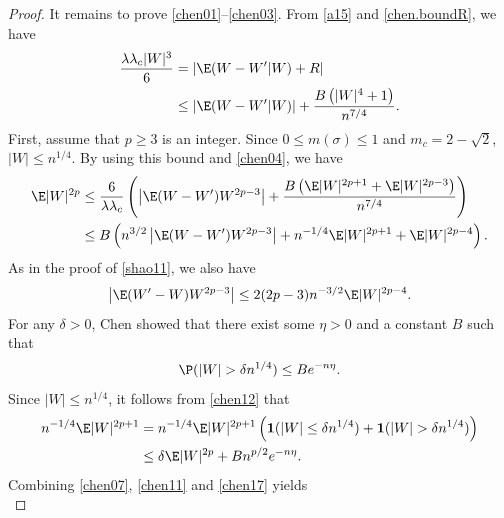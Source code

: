 \begin{proof}
		It remains to prove \eqref{chen01}--\eqref{chen03}. 
		From \eqref{a15} and \eqref{chen.boundR}, we have
		\begin{equation}\label{chen04}
			\begin{split}
				\frac{\lambda \lambda_c |W|^3}{6}&=|\E(W-W'|W)+R|\\
				&\le |\E(W-W'|W)|+\frac{B\left(|W|^4+1\right)}{n^{7/4}}.
			\end{split}
		\end{equation}
First, assume that $p\ge 3$ is an integer.
Since $0\le m(\sigma)\le 1$ and $m_c=2-\sqrt{2}$, $|W|\le n^{1/4}$. By using this bound and \eqref{chen04}, we have
		\begin{equation}\label{chen07}
			\begin{split}
				\E|W|^{2p}&\le 	\frac{6}{\lambda\lambda_c}\left(\left|\E(W-W')W^{2p-3}\right|+\frac{B\left(\E|W|^{2p+1}+\E|W|^{2p-3}\right)}{n^{7/4}}\right)\\
				&\le B\left(n^{3/2}\left|\E(W-W')W^{2p-3}\right|+n^{-1/4}\E|W|^{2p+1}+\E|W|^{2p-4}\right).
			\end{split}
		\end{equation}
		As in the proof of \eqref{shao11}, we also have
		\begin{equation}\label{chen11}
			\begin{split}
				\left|\E(W'-W)W^{2p-3}\right|\le 2(2p-3)n^{-3/2}\E|W|^{2p-4}.
			\end{split}
		\end{equation}
		For any $\delta>0$, Chen \cite{chen2016limit} showed that there exist some $\eta>0$ and a constant $B$ such that
		\begin{equation}\label{chen12}
			\begin{split}
				\P(|W|>\delta n^{1/4})\le Be^{-n\eta}.
			\end{split}
		\end{equation}
Since $|W|\le n^{1/4}$, it follows from \eqref{chen12} that
		\begin{equation}\label{chen17}
			\begin{split}
n^{-1/4}\E|W|^{2p+1}&=n^{-1/4}\E|W|^{2p+1}\left(\mathbf{1}(|W|\le \delta n^{1/4})+\mathbf{1}(|W|> \delta n^{1/4})\right)\\
				&\le \delta \E|W|^{2p}+Bn^{p/2}e^{-n\eta}.
			\end{split}
		\end{equation}
		Combining \eqref{chen07}, \eqref{chen11} and \eqref{chen17} yields
		\begin{equation}\label{chen19}

\end{equation}
\end{proof}
